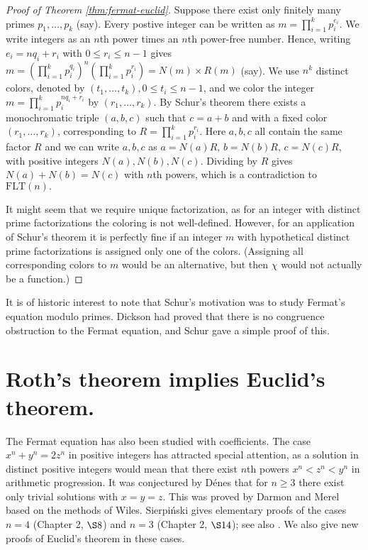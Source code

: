 \documentclass[12pt]{article}
\theoremstyle{theorem}
\theoremstyle{definition}
\newcommand{\FLT}{\mathrm{FLT}}
\begin{document}
\begin{proof}[Proof of Theorem \ref{thm:fermat-euclid}]
Suppose there exist only finitely many primes $p_1, \ldots, p_k$ (say).
Every postive integer
can be written as $m= \prod_{i=1}^k p_i^{e_i}$. We write
integers as an $n$th power times an $n$th power-free number.
Hence, writing $e_i=nq_i +r_i$ with \mbox{$0 \leq r_i \leq n-1$} gives
$m= \left(\prod_{i=1}^k p_i^{q_i}\right)^n \left( \prod_{i=1}^k
  p_i^{r_i}\right) =N(m)\times R(m)$ (say).
We use $n^k$ distinct colors, denoted by $(t_1, \ldots, t_k), 0 \leq t_i \leq
n-1$, and we
color the integer $m= \prod_{i=1}^k p_i^{n q_i +r_i}$ by $(r_1, \ldots ,r_k)$. 
By Schur's theorem there exists a monochromatic
triple $(a,b,c)$ such that $c=a+b$ and with a fixed color
$(r_1, \ldots , r_k)$, corresponding to
$R=\prod_{i=1}^k p_i^{r_i}$.
Here $a,b,c$ all contain the same factor $R$ and
we can write $a,b,c$ as $a=N(a)R,\, b=N(b)R,\, c=N(c)R$, 
with positive integers $N(a), N(b), N(c)$.
 Dividing by $R$
gives $N(a)+N(b)=N(c)$ with $n$th powers, which is a contradiction to 
$\FLT(n).$

It might seem that we require unique factorization, as for an integer
with distinct prime factorizations the coloring is not well-defined.
However, for an application of Schur's theorem
it is perfectly fine if an integer $m$ with hypothetical distinct 
prime factorizations is assigned only one of the colors.
(Assigning all corresponding colors to $m$ would be an alternative, but then
$\chi$ would not actually be a function.)
\end{proof}

It is of historic interest to note that Schur's motivation was to study
Fermat's equation modulo primes. Dickson had proved 
that there is no congruence obstruction to the Fermat equation, 
and Schur \cite{Schur} gave a simple proof of this.


\section{Roth's theorem implies Euclid's theorem.}
{\label{sec:Roth}}
The Fermat equation has also been studied with coefficients.
The case $x^n+y^n=2z^n$ in positive integers
has attracted special attention, as a solution in distinct positive integers
would mean that there exist $n$th powers $x^n< z^n< y^n$ 
in arithmetic progression.
It was conjectured by D\'{e}nes that for $n\geq 3$ there exist only
trivial solutions with $x=y=z$. This was proved by 
Darmon and Merel \cite{DarmonandMerel} based on
the methods of Wiles. 
Sierpi\'nski \cite{Sierpinski}
gives elementary proofs of the cases $n=4$ (Chapter 2, $\S 8$)
and $n=3$ (Chapter 2, $\S 14$); see also \cite{Carmichael}.
We also give new proofs of Euclid's theorem in these cases.
\end{document}
